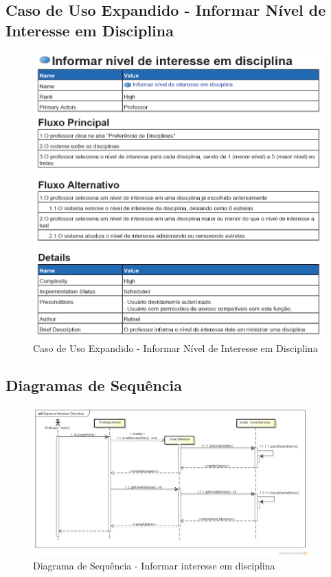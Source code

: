 \documentclass{abnt}
\begin{document}
		\subsection{Caso de Uso Expandido - Informar Nível de Interesse em Disciplina}
		\begin{figure}[h]
			\begin{center}
				 \includegraphics[width=450px]{casoUsoInformarNivelInteresseDisciplina}
				 \caption{Caso de Uso Expandido - Informar Nível de Interesse em Disciplina}
			\end{center}
		\end{figure}
		\FloatBarrier
		
		
		\subsection{Diagramas de Sequência}
		\begin{figure}[h]
					\begin{center}
						 \includegraphics[width=400px]{SequenceInteresseDisciplina}
						 \caption{Diagrama de Sequência - Informar interesse em disciplina}
					\end{center}
				\end{figure}
		
\end{document}
